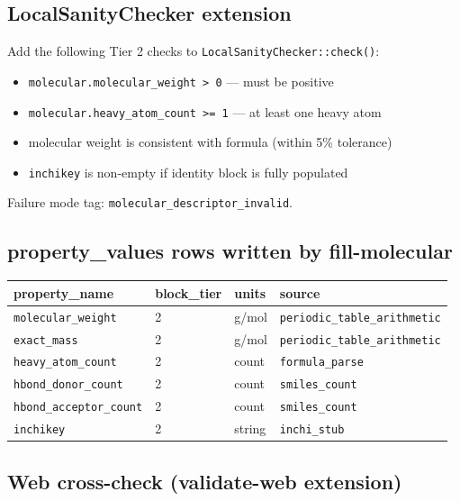 \documentclass[11pt, a4paper]{article}
\begin{document}
\subsection{LocalSanityChecker extension}

Add the following Tier 2 checks to \texttt{LocalSanityChecker::check()}:

\begin{itemize}[leftmargin=*, itemsep=2pt]
  \item \texttt{molecular.molecular\_weight > 0} --- must be positive
  \item \texttt{molecular.heavy\_atom\_count >= 1} --- at least one heavy atom
  \item molecular weight is consistent with formula (within 5\% tolerance)
  \item \texttt{inchikey} is non-empty if identity block is fully populated
\end{itemize}

Failure mode tag: \texttt{molecular\_descriptor\_invalid}.

\subsection{property\_values rows written by fill-molecular}

\begin{center}
\begin{tabular}{llll}
\toprule
\textbf{property\_name} & \textbf{block\_tier} & \textbf{units} & \textbf{source} \\
\midrule
\texttt{molecular\_weight}       & 2 & g/mol    & \texttt{periodic\_table\_arithmetic} \\
\texttt{exact\_mass}             & 2 & g/mol    & \texttt{periodic\_table\_arithmetic} \\
\texttt{heavy\_atom\_count}      & 2 & count    & \texttt{formula\_parse} \\
\texttt{hbond\_donor\_count}     & 2 & count    & \texttt{smiles\_count} \\
\texttt{hbond\_acceptor\_count}  & 2 & count    & \texttt{smiles\_count} \\
\texttt{inchikey}                & 2 & string   & \texttt{inchi\_stub} \\
\bottomrule
\end{tabular}
\end{center}

\subsection{Web cross-check (validate-web extension)}
\end{document}

